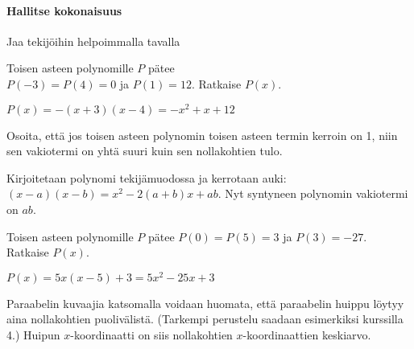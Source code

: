 \begin{tehtavasivu}
\paragraph*{Hallitse kokonaisuus}

\begin{tehtava}
    Jaa tekijöihin helpoimmalla tavalla
    \begin{alakohdat}
    \end{alakohdat}
    \begin{vastaus}
    	\begin{alakohdat}
        \end{alakohdat}
    \end{vastaus}
\end{tehtava}

\begin{tehtava}
    Toisen asteen polynomille $P$ pätee \\ $P(-3)=P(4)=0$ ja $P(1)=12$. Ratkaise $P(x)$.
    \begin{vastaus}
        $P(x)=-(x+3)(x-4)=-x^2+x+12$
    \end{vastaus}
\end{tehtava}

\begin{tehtava}
    Osoita, että jos toisen asteen polynomin toisen asteen termin kerroin on 1, niin sen vakiotermi on yhtä suuri kuin sen nollakohtien tulo.
    \begin{vastaus}
        Kirjoitetaan polynomi tekijämuodossa ja kerrotaan auki: $(x-a)(x-b)=x^2-2(a+b)x+ab$. Nyt syntyneen polynomin vakiotermi on $ab$.
    \end{vastaus}
\end{tehtava}


\begin{tehtava}
    Toisen asteen polynomille $P$ pätee $P(0)=P(5)=3$ ja $P(3)=-27$. Ratkaise $P(x)$.
    \begin{vastaus}
        $P(x)=5x(x-5)+3=5x^2-25x+3$
    \end{vastaus}
\end{tehtava}


\begin{tehtava}
    Paraabelin kuvaajia katsomalla voidaan huomata, että paraabelin huippu löytyy aina nollakohtien puolivälistä. (Tarkempi perustelu saadaan esimerkiksi kurssilla 4.)
    Huipun $x$-koordinaatti on siis nollakohtien $x$-koordinaattien keskiarvo.
    \begin{alakohdat}
      

\end{alakohdat}
\end{tehtava}
\end{tehtavasivu}
